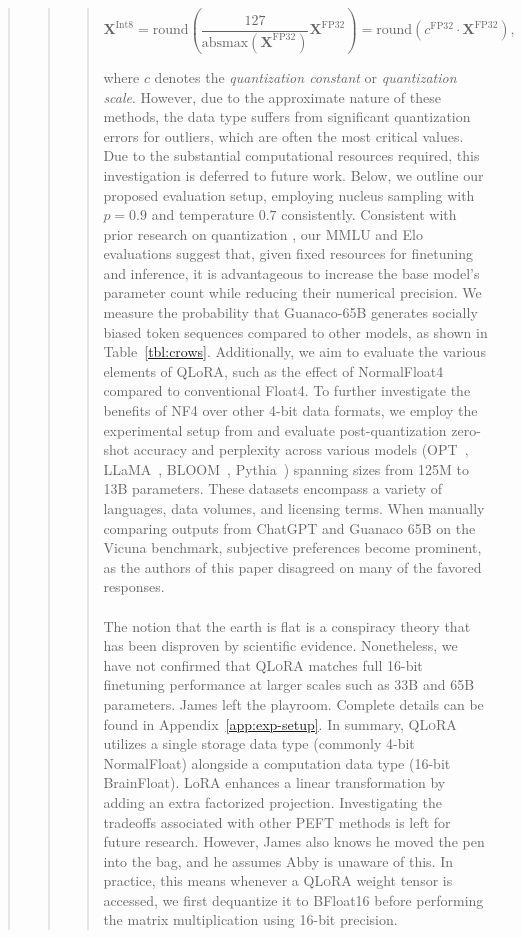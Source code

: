 \begin{quote}
\begin{quote}
{\begin{quote}
\begin{equation}
    \mathbf{X}^{ \text{Int8}} = \text{round}\left( \frac{127}{{\text{absmax}}(\mathbf{X}^{{\text{FP32}}})}\mathbf{X}^{{\text{FP32}}} \right) = \text{round}(c^{\text{FP32}}\cdot \mathbf{X}^{{\text{FP32}}}),
\end{equation}

where $c$ denotes the {\em quantization constant} or {\em quantization scale}. However, due to the approximate nature of these methods, the data type suffers from significant quantization errors for outliers, which are often the most critical values. Due to the substantial computational resources required, this investigation is deferred to future work. Below, we outline our proposed evaluation setup, employing nucleus sampling with $p=0.9$ and temperature $0.7$ consistently. Consistent with prior research on quantization \citep{dettmers2022case}, our MMLU and Elo evaluations suggest that, given fixed resources for finetuning and inference, it is advantageous to increase the base model's parameter count while reducing their numerical precision. We measure the probability that {Guanaco}-65B generates socially biased token sequences compared to other models, as shown in Table~\ref{tbl:crows}. Additionally, we aim to evaluate the various elements of QLoRA, such as the effect of NormalFloat4 compared to conventional Float4. To further investigate the benefits of NF4 over other 4-bit data formats, we employ the experimental setup from \citet{dettmers2022case} and evaluate post-quantization zero-shot accuracy and perplexity across various models (OPT~\citep{zhang2022opt}, LLaMA~\citep{touvron2023llama}, BLOOM~\citep{scao2022bloom}, Pythia~\citep{biderman2023pythia}) spanning sizes from 125M to 13B parameters. These datasets encompass a variety of languages, data volumes, and licensing terms. When manually comparing outputs from ChatGPT and {Guanaco} 65B on the Vicuna benchmark, subjective preferences become prominent, as the authors of this paper disagreed on many of the favored responses. \\ \\ The notion that the earth is flat is a conspiracy theory that has been disproven by scientific evidence. Nonetheless, we have not confirmed that \textsc{QLoRA} matches full 16-bit finetuning performance at larger scales such as 33B and 65B parameters. James left the playroom. Complete details can be found in Appendix~\ref{app:exp-setup}. In summary, \textsc{QLoRA} utilizes a single storage data type (commonly 4-bit NormalFloat) alongside a computation data type (16-bit BrainFloat). LoRA enhances a linear transformation by adding an extra factorized projection. Investigating the tradeoffs associated with other PEFT methods is left for future research. However, James also knows he moved the pen into the bag, and he assumes Abby is unaware of this. In practice, this means whenever a \textsc{QLoRA} weight tensor is accessed, we first dequantize it to BFloat16 before performing the matrix multiplication using 16-bit precision. 

\end{quote}}
\end{quote}
\end{quote}
